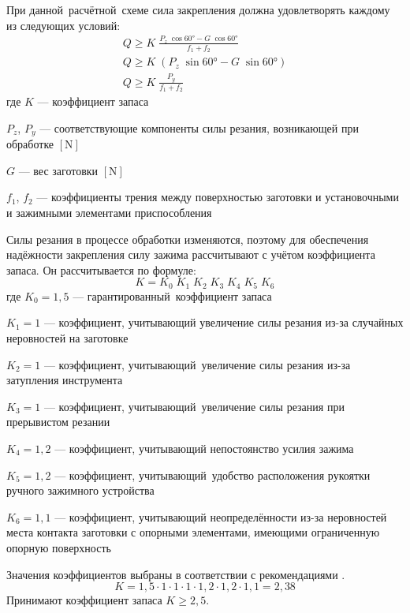 \documentclass[14pt,russian,a4paper]{extreport}
\begin{document}
При данной расчётной схеме сила закрепления должна удовлетворять каждому из следующих условий:
\begin{gather}
  Q \geq K \; \frac{P_z \; \cos{\ang{60}} - G \; \cos{\ang{60}}}{f_1 + f_2} \\
  Q \geq K \; ( P_z \; \sin{\ang{60}} - G \; \sin{\ang{60}} ) \\
  Q \geq K \; \frac{P_y}{f_1 + f_2}
\end{gather}
где $K$ --- коэффициент запаса \par
$P_z$, $P_y$ --- соответствующие компоненты силы резания, возникающей при обработке $\left[\si{\newton}\right]$ \par
$G$ --- вес заготовки $\left[\si{\newton}\right]$ \par
$f_1$, $f_2$ --- коэффициенты трения между поверхностью заготовки и установочными и зажимными элементами приспособления

Силы резания в процессе обработки изменяются, поэтому для обеспечения надёжности закрепления силу зажима рассчитывают с учётом коэффициента запаса. Он рассчитывается по формуле:
\begin{equation*}
  K = K_0 \; K_1 \; K_2 \; K_3 \; K_4 \; K_5 \; K_6
\end{equation*}
где $K_0 = 1,5$ --- гарантированный коэффициент запаса \par
$K_1 = 1$ --- коэффициент, учитывающий увеличение силы резания из-за случайных неровностей на заготовке\par
$K_2 = 1$ --- коэффициент, учитывающий увеличение силы резания из-за затупления инструмента \par
$K_3 = 1$ --- коэффициент, учитывающий увеличение силы резания при прерывистом резании \par
$K_4 = 1,2$ --- коэффициент, учитывающий непостоянство усилия зажима \par
$K_5 = 1,2$ --- коэффициент, учитывающий удобство расположения рукоятки ручного зажимного устройства \par
$K_6 = 1,1$ --- коэффициент, учитывающий неопределённости из-за неровностей места контакта заготовки с опорными элементами, имеющими ограниченную опорную поверхность

Значения коэффициентов выбраны в соответствии с рекомендациями \cite[разд.~4.1]{tarabarin:pto}.
\begin{equation*}
  K = 1,5 \cdot 1 \cdot 1 \cdot 1 \cdot 1,2 \cdot 1,2 \cdot 1,1 = 2,38
\end{equation*}
Принимают коэффициент запаса $K \geq 2,5$.
\end{document}
